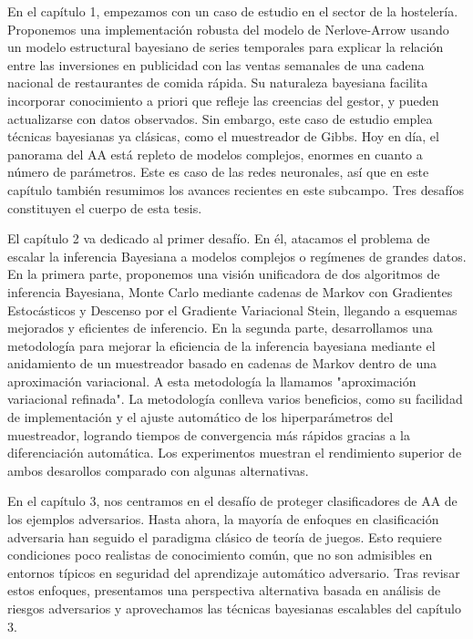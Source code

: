 \documentclass[a4paper, 11pt, openright, twoside]{reportPhD}
\numberwithin{figure}{chapter}
\numberwithin{table}{chapter}
\numberwithin{equation}{chapter}
\begin{document}
En el capítulo 1, empezamos con un caso de estudio en el sector de la hostelería. Proponemos una implementación robusta del modelo de Nerlove-Arrow usando un modelo  estructural bayesiano de series temporales para explicar la relación entre las inversiones en publicidad con las ventas semanales de una cadena nacional de restaurantes de comida rápida. Su naturaleza bayesiana facilita  incorporar conocimiento a priori que refleje las creencias del gestor, y pueden  actualizarse con datos observados. Sin embargo, este caso de estudio emplea técnicas bayesianas ya clásicas, como el muestreador de Gibbs. Hoy en día, el panorama del AA está repleto de modelos complejos, enormes en cuanto a número de parámetros. Este es caso de las redes neuronales, así que en este capítulo también resumimos los avances recientes en este subcampo. Tres desafíos constituyen el cuerpo de esta tesis.

El capítulo 2 va dedicado al primer desafío. En él, atacamos el problema de escalar la inferencia Bayesiana a modelos complejos o regímenes de grandes datos. En la primera parte, proponemos una visión unificadora de dos algoritmos de inferencia Bayesiana, Monte Carlo mediante cadenas de Markov con Gradientes Estocásticos y Descenso por el Gradiente Variacional Stein, llegando a  esquemas mejorados y eficientes de inferencio. En la segunda parte, desarrollamos una metodología para mejorar la eficiencia de la inferencia bayesiana mediante el anidamiento de un muestreador basado en cadenas de Markov dentro de una aproximación variacional. A esta metodología la llamamos "aproximación variacional refinada". La metodología conlleva varios beneficios, como su facilidad de implementación y el ajuste automático de los hiperparámetros del muestreador, logrando tiempos de convergencia más rápidos gracias a la diferenciación automática. Los experimentos muestran el rendimiento superior de ambos desarollos comparado con algunas alternativas.

En el capítulo 3, nos centramos en el desafío de proteger clasificadores de AA de los ejemplos adversarios. Hasta ahora, la mayoría de enfoques en clasificación adversaria han seguido el paradigma clásico de teoría de juegos. Esto requiere condiciones poco realistas de conocimiento común, que no son admisibles en entornos típicos en seguridad del aprendizaje automático adversario. Tras revisar estos enfoques, presentamos una perspectiva alternativa basada en análisis de riesgos adversarios y aprovechamos las técnicas bayesianas escalables del capítulo 3.
\end{document}

